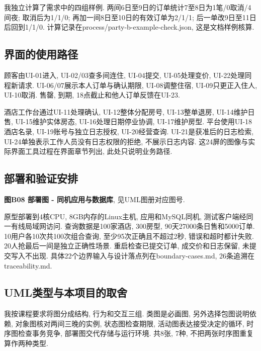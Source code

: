 \documentclass[cn,nofont,11pt,a4paper]{elegantpaper}
\begin{document}
我独立计算了需求中的四组样例. 两间6日至9日的订单统计7至8日为1笔/0取消/4间夜; 取消后为1/1/0; 再加一间8日至10日的有效订单为2/1/1; 后一单改9日至11日后回到1/1/0. 计算记录在process/party-b-example-check.json, 这是文档样例核算.

\hypertarget{ux754cux9762ux7684ux4f7fux7528ux8defux5f84}{%
\subsection{界面的使用路径}\label{ux754cux9762ux7684ux4f7fux7528ux8defux5f84}}

顾客由UI-01进入, UI-02/03查多间连住, UI-04提交, UI-05处理变价, UI-22处理同程新请求. UI-06/07展示本人订单与确认期限, UI-08调整住宿, UI-09只更正入住人, UI-10取消. 售罄, 到期, 18点截止和他人订单反馈在UI-23.

酒店工作台通过UI-11处理确认, UI-12整体分配房号, UI-13整单退房, UI-14维护日售, UI-15维护实体房态, UI-16处理日期停业协调, UI-17维护房型. 平台使用UI-18酒店名录, UI-19账号与独立日志授权, UI-20经营查询. UI-21是获准后的日志检索, UI-24单独表示工作人员没有日志权限的拒绝, 不展示日志内容. 这24屏的图像与实际界面工具过程在界面章节列出, 此处只说明业务路径.

\hypertarget{ux90e8ux7f72ux548cux9a8cux8bc1ux5b89ux6392}{%
\subsection{部署和验证安排}\label{ux90e8ux7f72ux548cux9a8cux8bc1ux5b89ux6392}}

\textbf{图B08 部署图 - 同机应用与数据库}, 见UML图册对应图号.

原型部署到4核CPU, 8GB内存的Linux主机, 应用和MySQL同机, 测试客户端经同一有线局域网访问. 查询数据是100家酒店, 300房型, 90天27000条日售和5000订单. 10用户各10次共100次组合查询, 至少95次正确且不超过2秒, 错误和超时都计失败. 20人抢最后一间是独立正确性场景. 重启检查已提交订单, 成交价和日志保留, 未提交写入不出现. 具体22个边界输入与设计落点列在boundary-cases.md, 26条追溯在traceability.md.

\hypertarget{umlux7c7bux578bux4e0eux672cux9879ux76eeux7684ux53d6ux820d}{%
\subsection{UML类型与本项目的取舍}\label{umlux7c7bux578bux4e0eux672cux9879ux76eeux7684ux53d6ux820d}}

我按课程要求将图分成结构, 行为和交互三组. 类图是必画图, 另外选择包图说明依赖, 对象图核对两间三晚的实例, 状态图检查期限, 活动图表达接受决定的循环, 时序图检查事务竞争, 部署图交代存储与运行环境. 共8张, 7种, 不把两张时序图重复算作两种类型.
\end{document}
